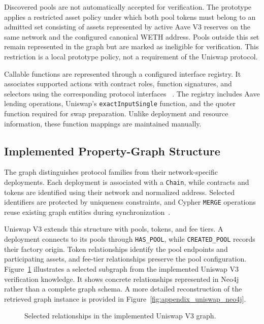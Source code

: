Discovered pools are not automatically accepted for
verification. The prototype applies a restricted asset
policy under which both pool tokens must belong to an
admitted set consisting of assets represented by active
Aave V3 reserves on the same network and the configured
canonical WETH address. Pools outside this set remain
represented in the graph but are marked as ineligible
for verification. This restriction is a local prototype
policy, not a requirement of the Uniswap protocol.

Callable functions are represented through a configured
interface registry. It associates supported actions with
contract roles, function signatures, and selectors using
the corresponding protocol interfaces
~\cite{implAavePool,implUniswapSingleSwap,implSolidityABI}.
The registry includes Aave lending operations, Uniswap's
\texttt{exactInputSingle} function, and the quoter function
required for swap preparation. Unlike deployment and
resource information, these function mappings are
maintained manually.

\subsection{Implemented Property-Graph Structure}

The graph distinguishes protocol families from their
network-specific deployments. Each deployment is associated
with a \texttt{Chain}, while contracts and tokens are
identified using their network and normalized address.
Selected identifiers are protected by uniqueness constraints,
and Cypher \texttt{MERGE} operations reuse existing graph
entities during synchronization~\cite{implNeo4jCypher}.


Uniswap V3 extends this structure with pools, tokens,
and fee tiers. A deployment connects to its pools through
\texttt{HAS\_POOL}, while \texttt{CREATED\_POOL} records
their factory origin. Token relationships identify the
pool endpoints and participating assets, and fee-tier
relationships preserve the pool configuration.
Figure~\ref{fig:uniswap_graph_implementation}
illustrates a selected subgraph from the implemented
Uniswap V3 verification knowledge. It shows concrete
relationships represented in Neo4j rather than a
complete graph schema. A more detailed reconstruction
of the retrieved graph instance is provided in
Figure~\ref{fig:appendix_uniswap_neo4j}.


\begin{figure}[H]
    \centering
    \resizebox{\linewidth}{!}{%
    }
    \caption{Selected relationships in the implemented
    Uniswap V3 graph.}
    \label{fig:uniswap_graph_implementation}
\end{figure}

